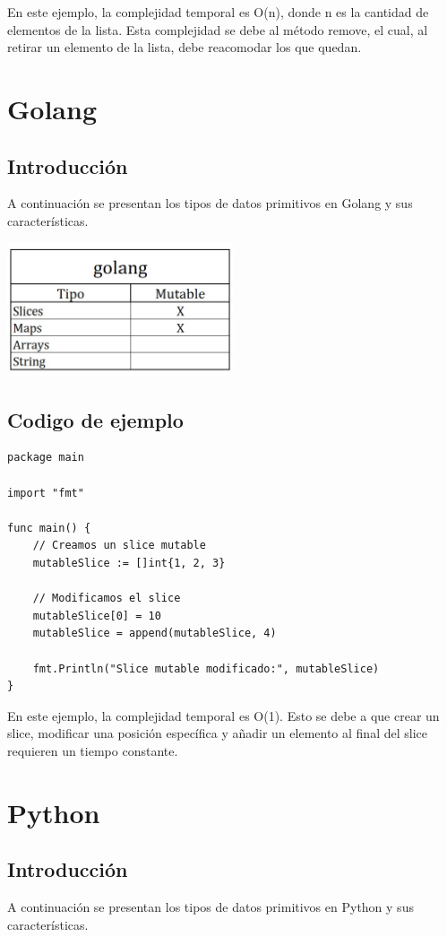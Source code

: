 \documentclass{article}
\begin{document}
En este ejemplo, la complejidad temporal es O(n), donde n es la cantidad de elementos de la lista. Esta complejidad se debe al método remove, el cual, al retirar un elemento de la lista, debe reacomodar los que quedan.


\section{Golang}
\subsection{Introducción}
A continuación se presentan los tipos de datos primitivos en Golang y sus características.

\includegraphics[width=0.5\textwidth]{golangTabla.jpg}

\subsection{Codigo de ejemplo}
\begin{lstlisting}[language=Golang, caption=Ejemplo de código en Golang]
package main

import "fmt"

func main() {
    // Creamos un slice mutable
    mutableSlice := []int{1, 2, 3}
    
    // Modificamos el slice
    mutableSlice[0] = 10
    mutableSlice = append(mutableSlice, 4)
    
    fmt.Println("Slice mutable modificado:", mutableSlice)
}
\end{lstlisting}

En este ejemplo, la complejidad temporal es O(1). Esto se debe a que crear un slice, modificar una posición específica y añadir un elemento al final del slice requieren un tiempo constante.

\section{Python}
\subsection{Introducción}
A continuación se presentan los tipos de datos primitivos en Python y sus características.
\end{document}
